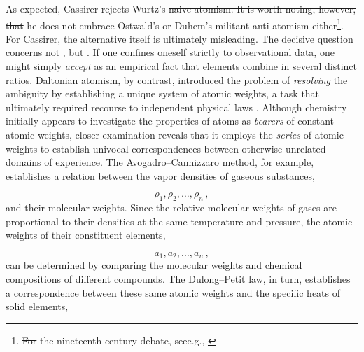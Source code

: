 \documentclass[submitted,12pt]{article}
\providecommand{\DIFadd}[1]{{\protect\color{blue}\uwave{#1}}} %
\providecommand{\DIFdel}[1]{{\protect\color{red}\sout{#1}}}                      %
\providecommand{\DIFaddbegin}{} %
\providecommand{\DIFaddend}{} %
\providecommand{\DIFdelbegin}{} %
\providecommand{\DIFdelend}{} %
\begin{document}
As expected, Cassirer rejects Wurtz's \DIFdelbegin \DIFdel{naive atomism. It is worth noting, however, that }\DIFdelend \DIFaddbegin {} \DIFadd{atomism. However, }\DIFaddend he does not embrace Ostwald's or Duhem's militant anti-atomism either\footnote{\DIFdelbegin \DIFdel{For }\DIFdelend \DIFaddbegin \DIFadd{\mbox{%
\cite{Needham2008}}\hskip0pt%
; for }\DIFaddend the nineteenth-century debate, see\DIFaddbegin \DIFadd{, }\DIFaddend e.g., \citet{Rocke1984}\DIFaddbegin \DIFadd{.}\DIFaddend }. For Cassirer, the alternative itself is ultimately misleading. The decisive question concerns not , but  . If one confines oneself strictly to observational data, one might simply \emph{accept} as an empirical fact that elements combine in several distinct ratios. Daltonian atomism, by contrast, introduced the problem of \emph{resolving} the ambiguity by establishing a unique system of atomic weights, a task that ultimately required recourse to independent physical laws \cite[see][lect.~IV]{Ladenburg1902}. Although chemistry initially appears to investigate the properties of atoms as \emph{bearers} of constant atomic weights, closer examination reveals that it employs the \emph{series} of atomic weights to establish univocal correspondences between otherwise unrelated domains of experience. The Avogadro--Cannizzaro method, for example, establishes a relation between the vapor densities of gaseous substances,


\begin{equation*}
\rho_1, \rho_2, \ldots, \rho_n\,,
\end{equation*}
%
and their molecular weights. Since the relative molecular weights of gases are proportional to their densities at the same temperature and pressure, the atomic weights of their constituent elements,

\begin{equation*}
a_1, a_2, \ldots, a_n\,,
\end{equation*}
%
can be determined by comparing the molecular weights and chemical compositions of different compounds. The Dulong--Petit law, in turn, establishes a correspondence between these same atomic weights and the specific heats of solid elements,
\end{document}
